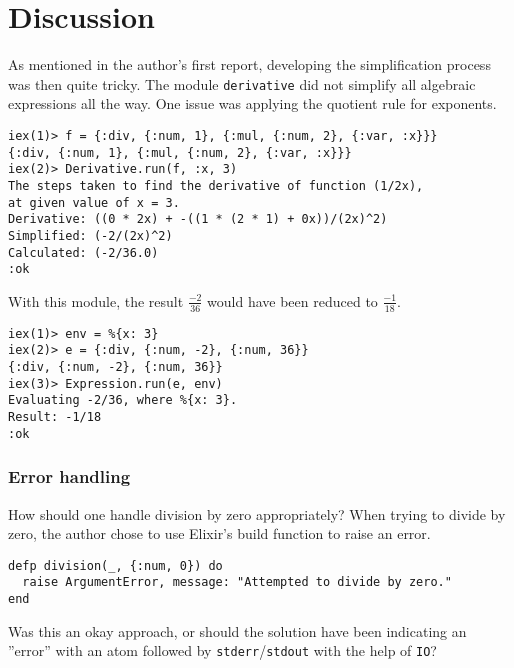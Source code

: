 \documentclass[a4paper,11pt]{article}
\begin{document}
\section*{Discussion}
\label{sec:discussion}
As mentioned in the author's first report,
developing the simplification process was then quite tricky.
The module \texttt{derivative} did not simplify
all algebraic expressions all the way.
One issue was applying the quotient rule for exponents.
\begin{verbatim}
iex(1)> f = {:div, {:num, 1}, {:mul, {:num, 2}, {:var, :x}}}
{:div, {:num, 1}, {:mul, {:num, 2}, {:var, :x}}}
iex(2)> Derivative.run(f, :x, 3)
The steps taken to find the derivative of function (1/2x),
at given value of x = 3.
Derivative: ((0 * 2x) + -((1 * (2 * 1) + 0x))/(2x)^2)
Simplified: (-2/(2x)^2)
Calculated: (-2/36.0)
:ok
\end{verbatim}
With this module, the result $\frac{-2}{36}$ would have been reduced to $\frac{-1}{18}$.
\begin{verbatim}
iex(1)> env = %{x: 3}
iex(2)> e = {:div, {:num, -2}, {:num, 36}}
{:div, {:num, -2}, {:num, 36}}
iex(3)> Expression.run(e, env)
Evaluating -2/36, where %{x: 3}.
Result: -1/18
:ok
\end{verbatim}
\subsubsection*{Error handling}
How should one handle division by zero appropriately?
When trying to divide by zero, the author chose to use Elixir's build function
to raise an error.
\begin{verbatim}
defp division(_, {:num, 0}) do
  raise ArgumentError, message: "Attempted to divide by zero."
end
\end{verbatim}
Was this an okay approach, or should the solution have been indicating an ''error''
with an atom followed by \verb|stderr|/\verb|stdout| with the help of \verb|IO|?
\end{document}
